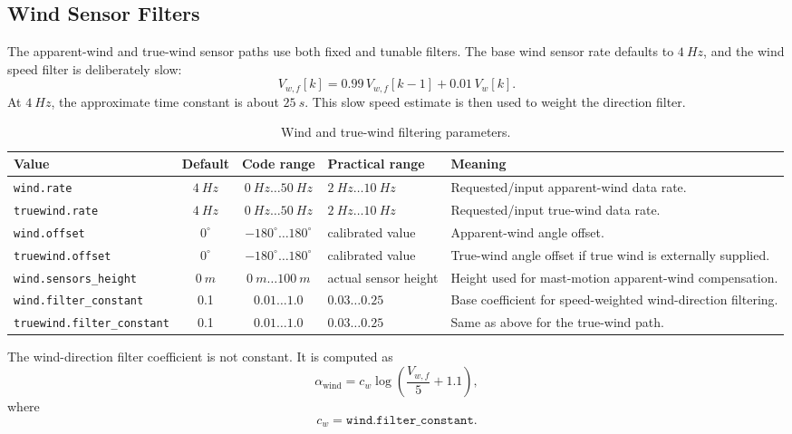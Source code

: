 \documentclass[11pt,twocolumn]{article}
\begin{document}
\subsection{Wind Sensor Filters}
The apparent-wind and true-wind sensor paths use both fixed and tunable
filters.  The base wind sensor rate defaults to \(\SI{4}{Hz}\), and the
wind speed filter is deliberately slow:
\[
V_{w,f}[k]
=
0.99\,V_{w,f}[k-1]
+
0.01\,V_w[k].
\]
At \(\SI{4}{Hz}\), the approximate time constant is about
\(\SI{25}{s}\).  This slow speed estimate is then used to weight the
direction filter.
\begin{table}[t]
\centering
\caption{Wind and true-wind filtering parameters.}
\label{tab:pypilot-wind-filters}
\begin{tabularx}{\textwidth}{Z{0.23\textwidth}c c Z{0.16\textwidth}Y}
\toprule
Value & Default & Code range & Practical range & Meaning \\
\midrule
\texttt{wind.rate} &
\(\SI{4}{Hz}\) &
\(\SI{0}{Hz}\ldots\SI{50}{Hz}\) &
\(\SI{2}{Hz}\ldots\SI{10}{Hz}\) &
Requested/input apparent-wind data rate. \\
\texttt{truewind.rate} &
\(\SI{4}{Hz}\) &
\(\SI{0}{Hz}\ldots\SI{50}{Hz}\) &
\(\SI{2}{Hz}\ldots\SI{10}{Hz}\) &
Requested/input true-wind data rate. \\
\texttt{wind.offset} &
\(0^\circ\) &
\(-180^\circ\ldots180^\circ\) &
calibrated value &
Apparent-wind angle offset. \\
\texttt{truewind.offset} &
\(0^\circ\) &
\(-180^\circ\ldots180^\circ\) &
calibrated value &
True-wind angle offset if true wind is externally supplied. \\
\texttt{wind.sensors\_height} &
\(\SI{0}{m}\) &
\(\SI{0}{m}\ldots\SI{100}{m}\) &
actual sensor height &
Height used for mast-motion apparent-wind compensation. \\
\texttt{wind.filter\_constant} &
\num{0.1} &
\(\num{0.01}\ldots\num{1.0}\) &
\(\num{0.03}\ldots\num{0.25}\) &
Base coefficient for speed-weighted wind-direction filtering. \\
\texttt{truewind.filter\_constant} &
\num{0.1} &
\(\num{0.01}\ldots\num{1.0}\) &
\(\num{0.03}\ldots\num{0.25}\) &
Same as above for the true-wind path. \\
\bottomrule
\end{tabularx}
\end{table}
The wind-direction filter coefficient is not constant.  It is computed as
\[
\alpha_{\mathrm{wind}}
=
c_w
\log\left(\frac{V_{w,f}}{5}+1.1\right),
\]
where
\[
c_w = \texttt{wind.filter\_constant}.
\]
\end{document}
